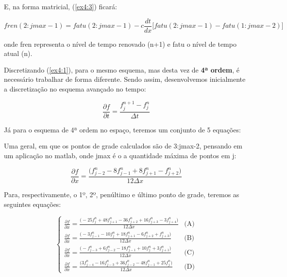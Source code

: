 \documentclass[11pt]{article}
\begin{document}
E, na forma matricial, (\ref{ex4:3}) ficará:

\begin{equation}
fren(2:jmax-1) = fatu(2:jmax-1) - c\frac{dt}{dx}\biggr[ fatu(2:jmax-1) - fatu(1:jmax-2) \biggr]
\label{ex4:4}
\end{equation}

onde fren representa o nível de tempo renovado (n+1) e fatu o nível de
tempo atual (n).

Discretizando (\ref{ex4:1}), para o mesmo esquema, mas desta vez de
\textbf{4ª ordem}, é necessário trabalhar de forma diferente. Sendo
assim, desenvolvemos inicialmente a discretização no esquema avançado no
tempo:

\begin{equation}
    \frac{\partial{f}}{\partial{t}} = \frac{f^{n+1}_{j} - f^{n}_{j}}{\Delta{t}}
    \label{ex4:5}
\end{equation}

Já para o esquema de 4ª ordem no espaço, teremos um conjunto de 5
equações:

Uma geral, em que os pontos de grade calculados são de 3:jmax-2,
pensando em um aplicação no matlab, onde jmax é o a quantidade máxima de
pontos em j:

\begin{equation}
    \frac{\partial{f}}{\partial{x}} = \frac{\biggl( f^{n}_{j-2} - 8f^{n}_{j-1} + 8f^{n}_{j+1} - f^{n}_{j+2}
    \bigg)}{12\Delta{x}}
    \label{ex4:6}
\end{equation}

Para, respectivamente, o 1º, 2º, penúltimo e último ponto de grade,
teremos as seguintes equações:

\begin{equation}
\begin{cases}
    \frac{\partial{f}}{\partial{x}} = \frac{\biggl( - 25f^{n}_{j} + 48f^{n}_{j+1} - 36f^{n}_{j+2} + 16f^{n}_{j+3} - 3f^{n}_{j+4} \bigg)}{12\Delta{x}} & \text{(A)}\\
    \frac{\partial{f}}{\partial{x}} = \frac{\biggl( - 3f^{n}_{j-1} - 10f^{n}_{j} + 18f^{n}_{j+1} - 6f^{n}_{j+2} + f^{n}_{j+3} \bigg)}{12\Delta{x}} & \text{(B)}\\
    \frac{\partial{f}}{\partial{x}} = \frac{\biggl( - f^{n}_{j-3} + 6f^{n}_{j-2} - 18f^{n}_{j-1} + 10f^{n}_{j} + 3f^{n}_{j+1} \bigg)}{12\Delta{x}} & \text{(C)}\\
    \frac{\partial{f}}{\partial{x}} = \frac{\biggl( 3f^{n}_{j-4} - 16f^{n}_{j-3} + 36f^{n}_{j-2} - 48f^{n}_{j-1} + 25f^{n}_{j} \bigg)}{12\Delta{x}} & \text{(D)}
    \label{ex4:7}
\end{cases}
\end{equation}
\end{document}
